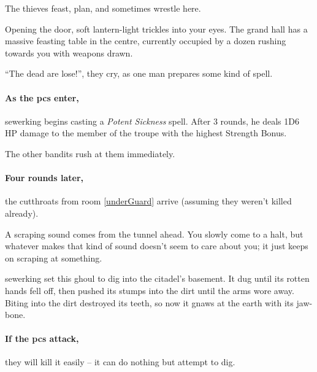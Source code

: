 
The thieves feast, plan, and sometimes wrestle here.

\begin{boxtext}
  Opening the door, soft lantern-light trickles into your eyes.
  The grand hall has a massive feasting table in the centre, currently occupied by a dozen rushing towards you with weapons drawn.

  ``The dead are lose!'', they cry, as one man prepares some kind of spell.
\end{boxtext}

\paragraph{As the \glspl{pc} enter,}
\gls{sewerking} begins casting a \textit{Potent Sickness} spell.
After 3 rounds, he deals 1D6 HP damage to the member of the troupe with the highest Strength Bonus.

The other bandits rush at them immediately.

\sewerking


\paragraph{Four rounds later,}
the cutthroats from room \ref{underGuard} arrive (assuming they weren't killed already).

\begin{boxtext}
  A scraping sound comes from the tunnel ahead.
  You slowly come to a halt, but whatever makes that kind of sound doesn't seem to care about you; it just keeps on scraping at something.
\end{boxtext}
 

\begin{exampletext}
  \Gls{sewerking} set this ghoul to dig into the citadel's basement.
  It dug until its rotten hands fell off, then pushed its stumps into the dirt until the arms wore away.
  Biting into the dirt destroyed its teeth, so now it gnaws at the earth with its jaw-bone.
\end{exampletext}

\paragraph{If the \glspl{pc} attack,}
they will kill it easily -- it can do nothing but attempt to dig.


